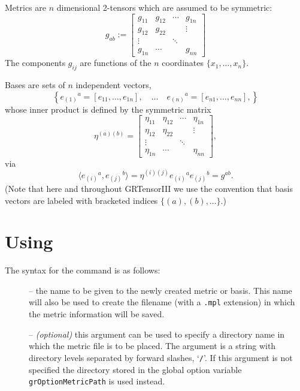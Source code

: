 \documentclass{article}
\begin{document}
Metrics are $n$ dimensional 2-tensors which are assumed to
be symmetric:
\[
  g_{ab} :=
  \left[
    \begin{array}{cccc}
      g_{11} & g_{12} & \cdots & g_{1n} \\
      g_{12} & g_{22} &        & \vdots \\
      \vdots &        & \ddots &        \\
      g_{1n} & \cdots &        & g_{nn}
    \end{array}
  \right]
\]
The components $g_{ij}$ are functions of the $n$ coordinates
$\{ x_1, \ldots, x_n\}$.

Bases are sets of $n$ independent vectors,
\[
  \left\{
    e_{(1)}{}^a = [ e_{11}, \ldots, e_{1n} ], \quad \ldots \quad
    e_{(n)}{}^a = [ e_{n1}, \ldots, e_{nn} ],
  \right\}
\]
whose inner product is defined by the symmetric matrix
\[
  \eta^{(a)(b)} =
    \left[
      \begin{array}{cccc}
      \eta_{11} & \eta_{12} & \cdots & \eta_{1n} \\
      \eta_{12} & \eta_{22} &        & \vdots \\
      \vdots    &           & \ddots &        \\
      \eta_{1n} & \cdots    &        & \eta_{nn}
    \end{array}
  \right],
\]
via
\[
  \langle e_{(i)}{}^a, e_{(j)}{}^b\rangle 
    = \eta^{(i)(j)} e_{(i)}{}^a e_{(j)}{}^b
    = g^{ab}.  
\] 
(Note that here and throughout GRTensorIII we use the convention that
basis vectors are labeled with bracketed indices $\{ (a), (b), \ldots \}$.)
%
\section{Using }\label{makeg}
%
The syntax for the  command is as follows:\\
\begin{cmdspec}
  \label{spec:makeg}

  \begin{description}

  \item[] -- the name to be given to the newly
    created metric or basis. This name will also be used to create the
    filename (with a \texttt{.mpl} extension) in which the metric
    information will be saved.  

\item[] -- \textit{(optional)} this argument can 
    be used to specify a directory name in which the metric file is to
    be placed. The argument is a string with directory levels
    separated by forward slashes, `\texttt{/}'. If this argument is
    not specified the directory stored in the global option variable
    \texttt{grOptionMetricPath} is used instead.
  \end{description}

\end{cmdspec}
\end{document}
